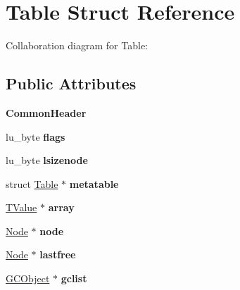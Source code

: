 \hypertarget{struct_table}{\section{Table Struct Reference}
\label{struct_table}
}


Collaboration diagram for Table\+:
\subsection*{Public Attributes}
\begin{DoxyCompactItemize}
\item 
\hypertarget{struct_table_aeceeffe77c9ef26aeca656183fc50110}{{\bfseries Common\+Header}}\label{struct_table_aeceeffe77c9ef26aeca656183fc50110}

\item 
\hypertarget{struct_table_a643cf38ebbab9e5af99ff8a980ffbae5}{lu\+\_\+byte {\bfseries flags}}\label{struct_table_a643cf38ebbab9e5af99ff8a980ffbae5}

\item 
\hypertarget{struct_table_aed057d880ebe0f38f65e626f646adf6a}{lu\+\_\+byte {\bfseries lsizenode}}\label{struct_table_aed057d880ebe0f38f65e626f646adf6a}

\item 
\hypertarget{struct_table_a99c20fa696fb6a4e89890efa3819ebdc}{struct \hyperlink{struct_table}{Table} $\ast$ {\bfseries metatable}}\label{struct_table_a99c20fa696fb6a4e89890efa3819ebdc}

\item 
\hypertarget{struct_table_a36bebd30ab45163c31feb821c936e160}{\hyperlink{structlua___t_value}{T\+Value} $\ast$ {\bfseries array}}\label{struct_table_a36bebd30ab45163c31feb821c936e160}

\item 
\hypertarget{struct_table_a519f179c707cb4e93bb66d09151c89e5}{\hyperlink{struct_node}{Node} $\ast$ {\bfseries node}}\label{struct_table_a519f179c707cb4e93bb66d09151c89e5}

\item 
\hypertarget{struct_table_a3c072f13eb5ce9103526b4aa83c284be}{\hyperlink{struct_node}{Node} $\ast$ {\bfseries lastfree}}\label{struct_table_a3c072f13eb5ce9103526b4aa83c284be}

\item 
\hypertarget{struct_table_a1b6f3d76efed2011a36ee7c78f65aa70}{\hyperlink{union_g_c_object}{G\+C\+Object} $\ast$ {\bfseries gclist}}\label{struct_table_a1b6f3d76efed2011a36ee7c78f65aa70}


\end{DoxyCompactItemize}
